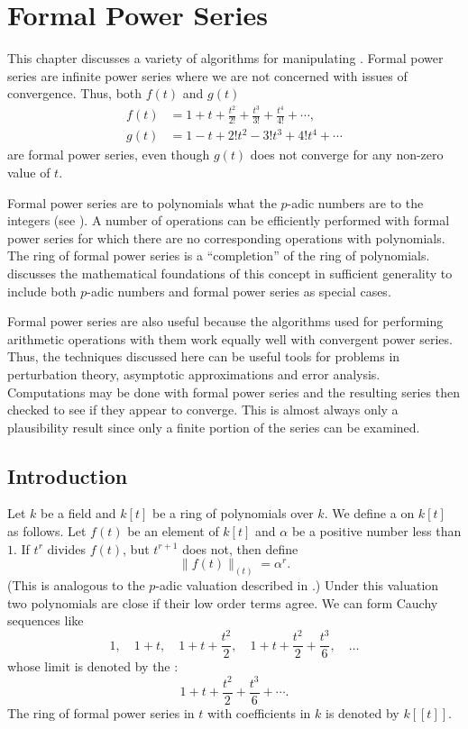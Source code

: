 \chapter{Formal Power Series}
\label{Series:Chap}

This chapter discusses a variety of algorithms for manipulating
.  Formal power series are infinite power
series where we are not concerned with issues of convergence.  Thus,
both $f(t)$ and $g(t)$
\[
\begin{aligned}
f(t) &= 1 + t + \frac{t^2}{2!} + \frac{t^3}{3!} + \frac{t^4}{4!} +
\cdots, \\
g(t) & = 1 - t + 2! t^2 - 3! t^3 + 4! t^4 + \cdots
\end{aligned}
\]
are formal power series, even though $g(t)$ does not converge for any
non-zero value of $t$. 

Formal power series are to polynomials what the $p$-adic numbers are
to the integers (see ).  A number of
operations can be efficiently performed with formal power series for
which there are no corresponding operations with polynomials.  The ring
of formal power series is a ``completion'' of the ring of polynomials.
 discusses the mathematical foundations of
this concept in sufficient generality to include both $p$-adic numbers
and formal power series as special cases. 

Formal power series are also useful because the algorithms used for
performing arithmetic operations with them work equally well with
convergent power series.  Thus, the techniques discussed here can be
useful tools for problems in perturbation theory, asymptotic
approximations and error analysis.  Computations may be done with
formal power series and the resulting series then checked to see if
they appear to converge.  This is almost always only a plausibility
result since only a finite portion of the series can be examined.

\section{Introduction}
\label{FPS:Intro:Sec}

Let $k$ be a field and $k[t]$ be a ring of polynomials over $k$.  We
define a  on $k[t]$ as follows.  Let $f(t)$ be an
element of $k[t]$ and $\alpha$ be a positive number less than $1$.  If
$t^r$ divides $f(t)$, but $t^{r+1}$ does not, then define
\[
\|f(t)\|_{(t)} = \alpha^{r}.
\]
(This is analogous to the $p$-adic valuation described in 
.)
Under this valuation two polynomials are close if their low order
terms agree.  We can form Cauchy sequences like
\[
1,\quad 1+ t,\quad 1 + t +\frac{t^2}{2},\quad 
 1 + t +\frac{t^2}{2} + \frac{t^3}{6},\quad \ldots
\]
whose limit is denoted by the :
\[
1 + t +\frac{t^2}{2} + \frac{t^3}{6} + \cdots.
\]
The ring of formal power series in $t$ with coefficients in
$k$ is denoted by $k[[t]]$.

